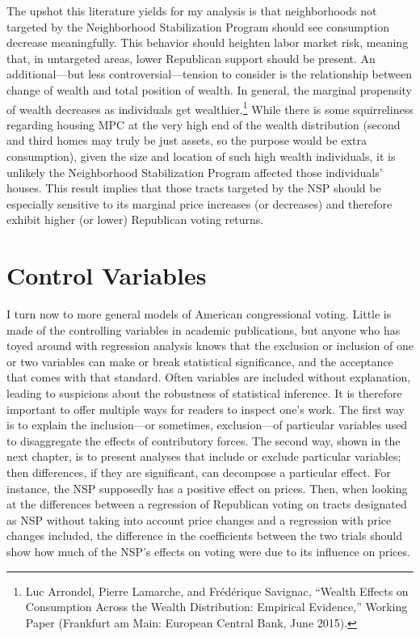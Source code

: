 \documentclass[12pt,oneside]{psthesis}
\begin{document}
The upshot this literature yields for my analysis is that neighborhoods not targeted by the Neighborhood Stabilization Program should see consumption decrease meaningfully.
This behavior should heighten labor market risk, meaning that, in untargeted areas, lower Republican support should be present.
An additional---but less controversial---tension to consider is the relationship between change of wealth and total position of wealth.
In general, the marginal propensity of wealth decreases as individuals get wealthier.\footnote{Luc Arrondel, Pierre Lamarche, and Frédérique Savignac, ``Wealth Effects on Consumption Across the Wealth Distribution: Empirical Evidence,'' Working Paper (Frankfurt am Main: European Central Bank, June 2015).}
While there is some squirreliness regarding housing MPC at the very high end of the wealth distribution (second and third homes may truly be just assets, so the purpose would be extra consumption), given the size and location of such high wealth individuals, it is unlikely the Neighborhood Stabilization Program affected those individuals' houses.
This result implies that those tracts targeted by the NSP should be especially sensitive to its marginal price increases (or decreases) and therefore exhibit higher (or lower) Republican voting returns.

\hypertarget{controls}{%
\section{Control Variables}\label{controls}}

I turn now to more general models of American congressional voting.
Little is made of the controlling variables in academic publications, but anyone who has toyed around with regression analysis knows that the exclusion or inclusion of one or two variables can make or break statistical significance, and the acceptance that comes with that standard.
Often variables are included without explanation, leading to suspicions about the robustness of statistical inference.
It is therefore important to offer multiple ways for readers to inspect one's work.
The first way is to explain the inclusion---or sometimes, exclusion---of particular variables used to disaggregate the effects of contributory forces.
The second way, shown in the next chapter, is to present analyses that include or exclude particular variables; then differences, if they are significant, can decompose a particular effect.
For instance, the NSP supposedly has a positive effect on prices.
Then, when looking at the differences between a regression of Republican voting on tracts designated as NSP without taking into account price changes and a regression with price changes included, the difference in the coefficients between the two trials should show how much of the NSP's effects on voting were due to its influence on prices.
\end{document}
